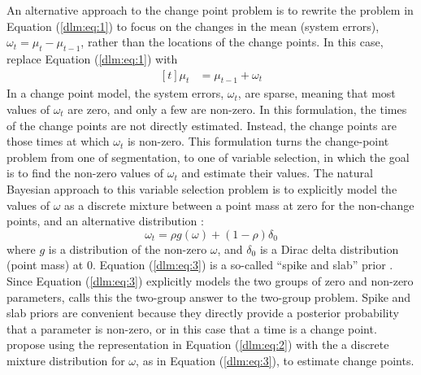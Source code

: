 An alternative approach to the change point problem is to rewrite the problem in Equation (\ref{dlm:eq:1}) to focus on the changes in the mean (system errors), $\omega_{t} = \mu_{t} - \mu_{t - 1}$, rather than the locations of the change points.
In this case, replace Equation (\ref{dlm:eq:1}) with
\begin{equation}
  \label{dlm:eq:2}
  \begin{aligned}[t]
    \mu_{t} &= \mu_{t - 1} + \omega_{t}
  \end{aligned}
\end{equation}
In a change point model, the system errors, $\omega_{t}$, are sparse, meaning that most values of $\omega_{t}$ are zero, and only a few are non-zero.
In this formulation, the times of the change points are not directly estimated.
Instead, the change points are those times at which $\omega_{t}$ is non-zero.
This formulation turns the change-point problem from one of segmentation, to one of variable selection, in which the goal is to find the non-zero values of $\omega_{t}$ and estimate their values.
The natural Bayesian approach to this variable selection problem is to explicitly model the values of $\omega$ as a discrete mixture between a point mass at zero for the non-change points, and an alternative distribution \parencites{MitchellBeauchamp1988a}{Efron2008a}:
\begin{equation}
  \label{dlm:eq:3}
  \omega_{t} = \rho g(\omega) + (1 - \rho) \delta_{0}
\end{equation}
where $g$ is a distribution of the non-zero $\omega$, and $\delta_{0}$ is a Dirac delta distribution (point mass) at 0.
Equation (\ref{dlm:eq:3}) is a so-called ``spike and slab'' prior \parencite{MitchellBeauchamp1988a}.
Since Equation (\ref{dlm:eq:3}) explicitly models the two groups of zero and non-zero parameters, \textcite{Efron2008a} calls this the two-group answer to the two-group problem.
Spike and slab priors are convenient because they directly provide a posterior probability that a parameter is non-zero, or in this case that a time is a change point.
\textcite{GiordaniKohn2008} propose using the representation in Equation (\ref{dlm:eq:2}) with the a discrete mixture distribution for $\omega$, as in Equation (\ref{dlm:eq:3}), to estimate change points.

